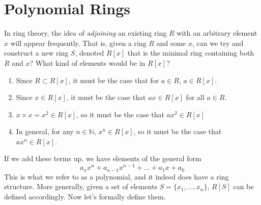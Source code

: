 \section{Polynomial Rings} 

  In ring theory, the idea of \textit{adjoining} an existing ring $R$ with an arbitrary element $x$ will appear frequently. That is, given a ring $R$ and some $x$, can we try and construct a new ring $S$, denoted $R[x]$ that is the minimal ring containing both $R$ and $x$? What kind of elements would be in $R[x]$? 
  \begin{enumerate}
    \item Since $R \subset R[x]$, it must be the case that for $a \in R$, $a \in R[x]$. 
    \item Since $x \in R[x]$, it must be the case that $a x \in R[x]$ for all $a \in R$. 
    \item $x \times x = x^2 \in R[x]$, so it must be the case that $a x^2 \in R[x]$ 
    \item In general, for any $n \in \mathbb{N}$, $x^n \in R[x]$, so it must be the case that $a x^n \in R[x]$. 
  \end{enumerate}
  If we add these terms up, we have elements of the general form 
  \begin{equation}
    a_n x^n + a_{n-1} x^{n-1} + \ldots + a_1 x + a_0 
  \end{equation}
  This is what we refer to as a polynomial, and it indeed does have a ring structure. More generally, given a set of elements $S = \{x_1, \ldots, x_n\}$, $R[S]$ can be defined accordingly. Now let's formally define them. 

